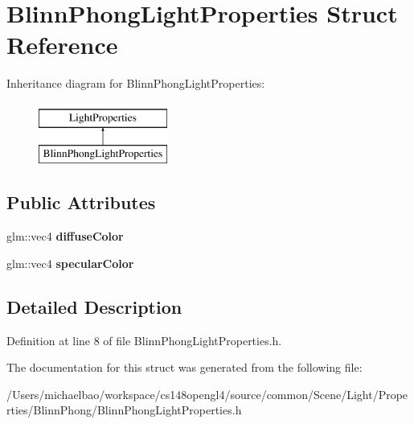 \hypertarget{struct_blinn_phong_light_properties}{}\section{Blinn\+Phong\+Light\+Properties Struct Reference}
\label{struct_blinn_phong_light_properties}
Inheritance diagram for Blinn\+Phong\+Light\+Properties\+:\begin{figure}[H]
\begin{center}
\leavevmode
\includegraphics[height=2.000000cm]{struct_blinn_phong_light_properties}
\end{center}
\end{figure}
\subsection*{Public Attributes}
\begin{DoxyCompactItemize}
\item 
\hypertarget{struct_blinn_phong_light_properties_aa12c81d848d370b8f79c9384d9fafec0}{}glm\+::vec4 {\bfseries diffuse\+Color}\label{struct_blinn_phong_light_properties_aa12c81d848d370b8f79c9384d9fafec0}

\item 
\hypertarget{struct_blinn_phong_light_properties_a815238c4f235333affb85f949ff8df06}{}glm\+::vec4 {\bfseries specular\+Color}\label{struct_blinn_phong_light_properties_a815238c4f235333affb85f949ff8df06}

\end{DoxyCompactItemize}


\subsection{Detailed Description}


Definition at line 8 of file Blinn\+Phong\+Light\+Properties.\+h.



The documentation for this struct was generated from the following file\+:\begin{DoxyCompactItemize}
\item 
/\+Users/michaelbao/workspace/cs148opengl4/source/common/\+Scene/\+Light/\+Properties/\+Blinn\+Phong/Blinn\+Phong\+Light\+Properties.\+h\end{DoxyCompactItemize}
